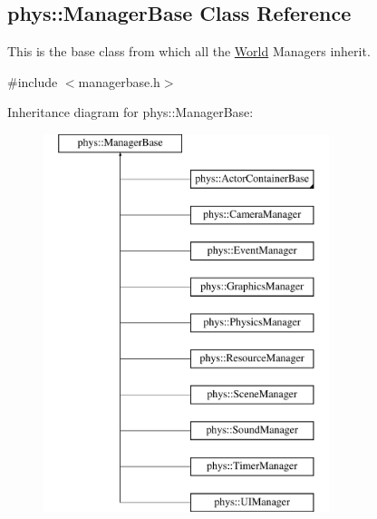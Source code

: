 \hypertarget{classphys_1_1ManagerBase}{
\subsection{phys::ManagerBase Class Reference}
\label{d2/de3/classphys_1_1ManagerBase}
}


This is the base class from which all the \hyperlink{classphys_1_1World}{World} Managers inherit.  




{\ttfamily \#include $<$managerbase.h$>$}

Inheritance diagram for phys::ManagerBase:\begin{figure}[H]
\begin{center}
\leavevmode
\includegraphics[height=11.000000cm]{d2/de3/classphys_1_1ManagerBase}
\end{center}
\end{figure}
